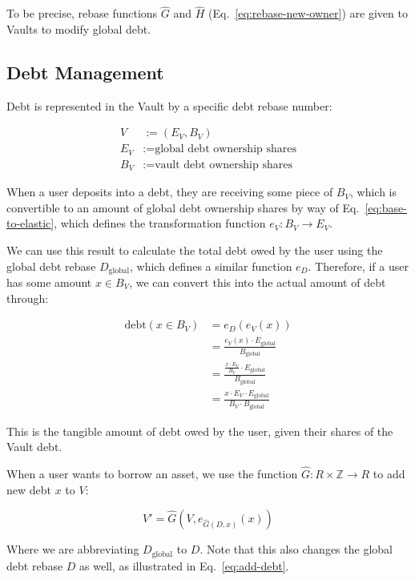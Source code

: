 \documentclass[letterpaper]{article}
\begin{document}
\begin{multicols}{2}
To be precise, rebase functions $\hat{G}$ and $\hat{H}$ (Eq.~\ref{eq:rebase-new-owner}) are given to Vaults to modify global debt.

\subsection{Debt Management}

Debt is represented in the Vault by a specific debt rebase number:

\begin{align}
    V &:= (E_{V}, B_{V}) \\
    E_{V} &:= \text{global debt ownership shares} \\
    B_{V} &:= \text{vault debt ownership shares}
\end{align}

When a user deposits into a debt, they are receiving some piece of $B_{V}$, which is convertible to an amount of global debt ownership shares by way of Eq.~\ref{eq:base-to-elastic}, which defines the transformation function $e_V: B_V \rightarrow E_V$.

We can use this result to calculate the total debt owed by the user using the global debt rebase $D_{\text{global}}$, which defines a similar function $e_D$. Therefore, if a user has some amount $x \in B_V$, we can convert this into the actual amount of debt through:

\begin{align}
    \text{debt}(x \in B_V) &= e_D(e_V(x)) \\
    &= \frac{e_V(x) \cdot E_{\text{global}}}{B_{\text{global}}} \\
    &= \frac{\frac{x \cdot E_V}{B_V} \cdot E_{\text{global}}}{B_{\text{global}}} \\
    &= \frac{x \cdot E_V \cdot E_{\text{global}}}{B_V \cdot B_{\text{global}}}
\end{align}

This is the tangible amount of debt owed by the user, given their shares of the Vault debt.

When a user wants to borrow an asset, we use the function $\hat{G}: R \times \mathbb{Z} \rightarrow R$ to add new debt $x$ to $V$:

\begin{equation}
    V' = \hat{G}(V, e_{\hat{G}(D, x)}(x))
\end{equation}

Where we are abbreviating $D_{\text{global}}$ to $D$. Note that this also changes the global debt rebase $D$ as well, as illustrated in Eq.~\ref{eq:add-debt}.


\end{multicols}
\end{document}
